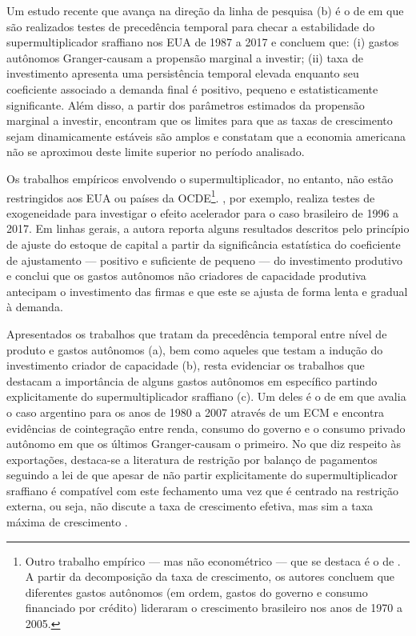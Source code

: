 Um estudo recente que avança na direção da linha de pesquisa (b) é o de \textcite{haluska_growth_2019} em que são realizados testes de precedência temporal para checar a estabilidade do supermultiplicador sraffiano nos EUA de 1987 a 2017 e concluem que: (i) gastos autônomos Granger-causam a propensão marginal a investir; (ii) taxa de investimento apresenta uma persistência temporal elevada enquanto seu coeficiente associado a demanda final é positivo, pequeno e estatisticamente significante. 
Além disso, a partir dos parâmetros estimados da propensão marginal a investir, encontram que os limites para que as taxas de crescimento sejam dinamicamente estáveis são amplos e constatam que a economia americana não se aproximou deste limite superior no período analisado.


Os trabalhos empíricos envolvendo o supermultiplicador, no entanto, não estão restringidos aos EUA ou países da OCDE\footnote{Outro trabalho empírico --- mas não econométrico --- que se destaca é o de \textcite{freitas_pattern_2013}.
	A partir da decomposição da taxa de crescimento, os autores concluem que diferentes gastos autônomos (em ordem, gastos do governo e consumo financiado por crédito) lideraram o crescimento brasileiro nos anos de 1970 a 2005.
}.  
\textcite{braga_investment_2018}, por exemplo, realiza testes de exogeneidade para investigar o efeito acelerador para o caso brasileiro de 1996 a 2017.
Em linhas gerais, a autora reporta alguns resultados descritos pelo princípio de ajuste do estoque de capital a partir da significância estatística do coeficiente de ajustamento --- positivo e suficiente de pequeno --- do investimento produtivo e conclui que os gastos autônomos não criadores de capacidade produtiva antecipam o investimento das firmas e que este se ajusta de forma lenta e gradual à demanda.

Apresentados os trabalhos que tratam da precedência temporal entre nível de produto e gastos autônomos (a), bem como aqueles que testam a indução do investimento criador de capacidade (b), resta evidenciar os trabalhos que destacam a importância de alguns gastos autônomos em específico partindo explicitamente do supermultiplicador sraffiano (c). 
Um deles é o de \textcite{medici_cointegration_2011} em que avalia o caso argentino para os anos de 1980 a 2007 através de um ECM e encontra evidências de cointegração entre renda, consumo do governo e o consumo privado autônomo em que os últimos Granger-causam o primeiro. 
No que diz respeito às exportações, destaca-se a literatura de restrição por balanço de pagamentos seguindo a lei de \textcite{mccombie_balance--payments_1994} que apesar de não partir explicitamente do supermultiplicador sraffiano é compatível com este fechamento uma vez que é centrado na restrição externa, ou seja, não discute a taxa de crescimento efetiva, mas sim a taxa máxima de crescimento \cite{bhering_thirlwall_2019}.


